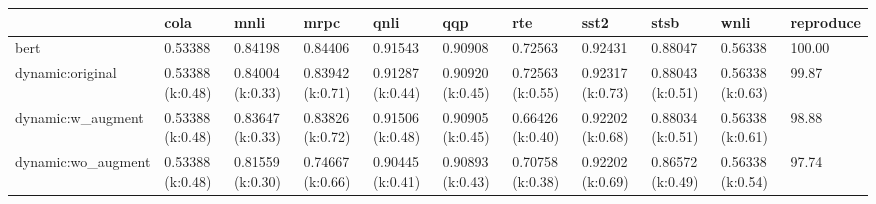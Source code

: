 \begin{tabular}{lllllllllll}
\toprule
{} &              cola &              mnli &              mrpc &              qnli &               qqp &               rte &              sst2 &              stsb &              wnli & reproduce \\
\midrule
bert               &           0.53388 &           0.84198 &           0.84406 &           0.91543 &           0.90908 &           0.72563 &           0.92431 &           0.88047 &           0.56338 &    100.00 \\
dynamic:original   &  0.53388 (k:0.48) &  0.84004 (k:0.33) &  0.83942 (k:0.71) &  0.91287 (k:0.44) &  0.90920 (k:0.45) &  0.72563 (k:0.55) &  0.92317 (k:0.73) &  0.88043 (k:0.51) &  0.56338 (k:0.63) &     99.87 \\
dynamic:w\_augment  &  0.53388 (k:0.48) &  0.83647 (k:0.33) &  0.83826 (k:0.72) &  0.91506 (k:0.48) &  0.90905 (k:0.45) &  0.66426 (k:0.40) &  0.92202 (k:0.68) &  0.88034 (k:0.51) &  0.56338 (k:0.61) &     98.88 \\
dynamic:wo\_augment &  0.53388 (k:0.48) &  0.81559 (k:0.30) &  0.74667 (k:0.66) &  0.90445 (k:0.41) &  0.90893 (k:0.43) &  0.70758 (k:0.38) &  0.92202 (k:0.69) &  0.86572 (k:0.49) &  0.56338 (k:0.54) &     97.74 \\
\bottomrule
\end{tabular}
